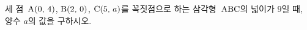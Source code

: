 세 점~$\mathrm{A}(0,\mkern3mu 4)$, $\mathrm{B}(2,\mkern3mu 0)$, $\mathrm{C}(5,\mkern3mu a)$를 꼭짓점으로 하는 삼각형~$\mathrm{ABC}$의 넓이가 $9$일 때, 양수 $a$의 값을 구하시오.
